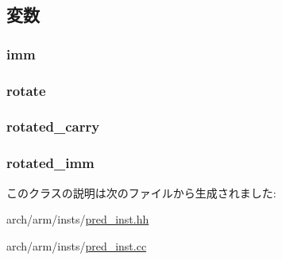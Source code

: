 \subsection{変数}
\hypertarget{classArmISA_1_1PredImmOp_a3aa9e175bd81b38df0e566643d5d4f8d}{
\subsubsection[{imm}]{ {\bf imm}}}
\label{classArmISA_1_1PredImmOp_a3aa9e175bd81b38df0e566643d5d4f8d}
\hypertarget{classArmISA_1_1PredImmOp_a64eafd8225233b1a693e0e79c9451c36}{
\subsubsection[{rotate}]{ {\bf rotate}}}
\label{classArmISA_1_1PredImmOp_a64eafd8225233b1a693e0e79c9451c36}
\hypertarget{classArmISA_1_1PredImmOp_a750d768d83e77cd1bb934dd34c4e9b4e}{
\subsubsection[{rotated\_\-carry}]{ {\bf rotated\_\-carry}}}
\label{classArmISA_1_1PredImmOp_a750d768d83e77cd1bb934dd34c4e9b4e}
\hypertarget{classArmISA_1_1PredImmOp_ab080bf5a74e561a7c7d966a6955099cb}{
\subsubsection[{rotated\_\-imm}]{ {\bf rotated\_\-imm}}}
\label{classArmISA_1_1PredImmOp_ab080bf5a74e561a7c7d966a6955099cb}


このクラスの説明は次のファイルから生成されました:\begin{DoxyCompactItemize}
\item 
arch/arm/insts/\hyperlink{pred__inst_8hh}{pred\_\-inst.hh}\item 
arch/arm/insts/\hyperlink{pred__inst_8cc}{pred\_\-inst.cc}\end{DoxyCompactItemize}
